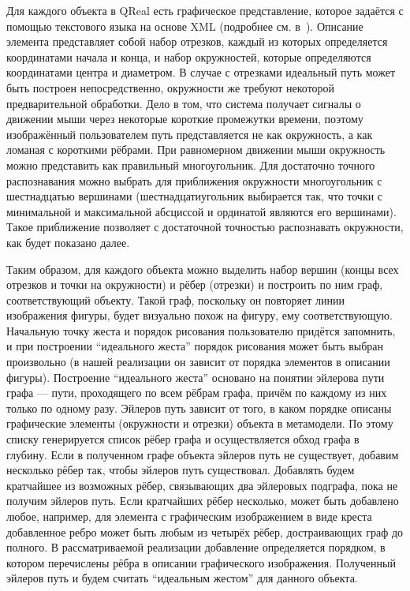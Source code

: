 \documentclass[a5paper]{article}
\begin{document}
Для каждого объекта в QReal есть графическое представление, которое задаётся с помощью текстового языка на основе XML (подробнее см. в~\cite{qreal}). Описание элемента представляет собой набор отрезков, каждый из которых определяется координатами начала и конца, и набор окружностей, которые определяются координатами центра и диаметром. В случае с отрезками идеальный путь может быть построен непосредственно, окружности же требуют некоторой предварительной обработки. Дело в том, что система получает сигналы о движении мыши через некоторые короткие промежутки времени, поэтому изображённый пользователем путь представляется не как окружность, а как ломаная с короткими рёбрами. При равномерном движении мыши окружность можно представить как правильный многоугольник. Для достаточно точного распознавания можно выбрать для приближения окружности многоугольник с шестнадцатью вершинами (шестнадцатиугольник выбирается так, что точки с минимальной и максимальной абсциссой и ординатой являются его вершинами). Такое приближение позволяет с достаточной точностью распознавать окружности, как будет показано далее.

Таким образом, для каждого объекта можно выделить набор вершин (концы всех отрезков и точки на окружности) и рёбер (отрезки) и построить по ним граф, соответствующий объекту. Такой граф, поскольку он повторяет линии изображения фигуры, будет визуально похож на фигуру, ему соответствующую. Начальную точку жеста и порядок рисования пользователю придётся запомнить, и при построении ``идеального жеста'' порядок рисования может быть выбран произвольно (в нашей реализации он зависит от порядка элементов в описании фигуры). Построение ``идеального жеста'' основано на понятии эйлерова пути графа --- пути, проходящего по всем рёбрам графа, причём по каждому из них только по одному разу. Эйлеров путь зависит от того, в каком порядке описаны графические элементы (окружности и отрезки) объекта в метамодели. По этому списку генерируется список рёбер графа и осуществляется обход графа в глубину. Если в полученном графе объекта эйлеров путь не существует, добавим несколько рёбер так, чтобы эйлеров путь существовал. Добавлять будем кратчайшее из возможных рёбер, связывающих два эйлеровых подграфа, пока не получим эйлеров путь. Если кратчайших рёбер несколько, может быть добавлено любое, например, для элемента с графическим изображением в виде креста добавленное ребро может быть любым из четырёх рёбер, достраивающих граф до полного. В рассматриваемой реализации добавление определяется порядком, в котором перечислены рёбра в описании графического изображения. Полученный эйлеров путь и будем считать ``идеальным жестом'' для данного объекта. 
\end{document}
